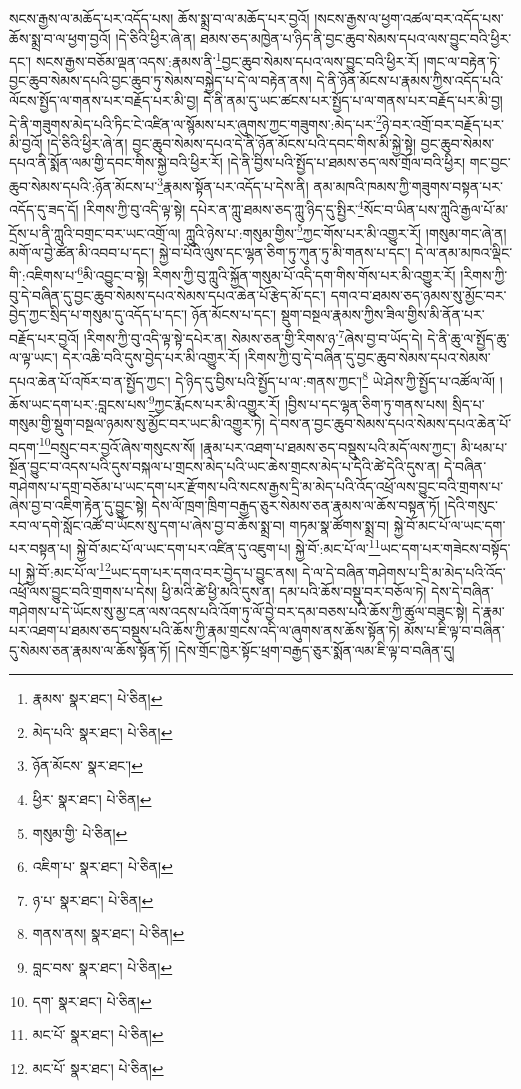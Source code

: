 སངས་རྒྱས་ལ་མཆོད་པར་འདོད་པས། ཆོས་སྨྲ་བ་ལ་མཆོད་པར་བྱའོ། །སངས་རྒྱས་ལ་ཕྱག་འཚལ་བར་འདོད་པས་ཆོས་སྨྲ་བ་ལ་ཕྱག་བྱའོ། །དེ་ཅིའི་ཕྱིར་ཞེ་ན། ཐམས་ཅད་མཁྱེན་པ་ཉིད་ནི་བྱང་ཆུབ་སེམས་དཔའ་ལས་བྱུང་བའི་ཕྱིར་དང་། སངས་རྒྱས་བཅོམ་ལྡན་འདས་:རྣམས་ནི་\footnote{རྣམས་  སྣར་ཐང་།  པེ་ཅིན། }བྱང་ཆུབ་སེམས་དཔའ་ལས་བྱུང་བའི་ཕྱིར་རོ། །གང་ལ་བརྟེན་ཏེ་བྱང་ཆུབ་སེམས་དཔའི་བྱང་ཆུབ་ཏུ་སེམས་བསྐྱེད་པ་དེ་ལ་བརྟེན་ནས། དེ་ནི་ཉོན་མོངས་པ་རྣམས་ཀྱིས་འདོད་པའི་ལོངས་སྤྱོད་ལ་གནས་པར་བརྗོད་པར་མི་བྱ། དེ་ནི་ནམ་དུ་ཡང་ཚངས་པར་སྤྱོད་པ་ལ་གནས་པར་བརྗོད་པར་མི་བྱ། དེ་ནི་གཟུགས་མེད་པའི་ཏིང་ངེ་འཛིན་ལ་སྙོམས་པར་ཞུགས་ཀྱང་གཟུགས་:མེད་པར་\footnote{མེད་པའི་  སྣར་ཐང་།  པེ་ཅིན། }ཉེ་བར་འགྲོ་བར་བརྗོད་པར་མི་བྱའོ། །དེ་ཅིའི་ཕྱིར་ཞེ་ན། བྱང་ཆུབ་སེམས་དཔའ་དེ་ནི་ཉོན་མོངས་པའི་དབང་གིས་མི་སྐྱེ་སྟེ། བྱང་ཆུབ་སེམས་དཔའ་ནི་སྨོན་ལམ་གྱི་དབང་གིས་སྐྱེ་བའི་ཕྱིར་རོ། །དེ་ནི་བྱིས་པའི་སྤྱོད་པ་ཐམས་ཅད་ལས་གྲོལ་བའི་ཕྱིར། གང་བྱང་ཆུབ་སེམས་དཔའི་:ཉོན་མོངས་པ་\footnote{ཉོན་མོངས་  སྣར་ཐང་། }རྣམས་སྟོན་པར་འདོད་པ་དེས་ནི། ནམ་མཁའི་ཁམས་ཀྱི་གཟུགས་བསྟན་པར་འདོད་དུ་ཟད་དོ། །རིགས་ཀྱི་བུ་འདི་ལྟ་སྟེ། དཔེར་ན་ཀླུ་ཐམས་ཅད་ཀླུ་ཉིད་དུ་སྤྱིར་\footnote{ཕྱིར་  སྣར་ཐང་།  པེ་ཅིན། }སོང་བ་ཡིན་པས་ཀླུའི་རྒྱལ་པོ་མ་དྲོས་པ་ནི་ཀླུའི་བགྲང་བར་ཡང་འགྲོ་ལ། ཀླུའི་ཉེས་པ་:གསུམ་གྱིས་\footnote{གསུམ་གྱི་  པེ་ཅིན། }ཀྱང་གོས་པར་མི་འགྱུར་རོ། །གསུམ་གང་ཞེ་ན། མགོ་ལ་བྱེ་ཚན་མི་འབབ་པ་དང་། སྐྱེ་བ་པོའི་ལུས་དང་ལྷན་ཅིག་ཏུ་ཀུན་ཏུ་མི་གནས་པ་དང་། དེ་ལ་ནམ་མཁའ་ལྡིང་གི་:འཇིགས་པ་\footnote{འཇིག་པ་  སྣར་ཐང་།  པེ་ཅིན། }མི་འབྱུང་བ་སྟེ། རིགས་ཀྱི་བུ་ཀླུའི་སྐྱོན་གསུམ་པོ་འདི་དག་གིས་གོས་པར་མི་འགྱུར་རོ། །རིགས་ཀྱི་བུ་དེ་བཞིན་དུ་བྱང་ཆུབ་སེམས་དཔའ་སེམས་དཔའ་ཆེན་པོ་རྩེད་མོ་དང་། དགའ་བ་ཐམས་ཅད་ཉམས་སུ་མྱོང་བར་བྱེད་ཀྱང་སྲིད་པ་གསུམ་དུ་འདོད་པ་དང་། ཉོན་མོངས་པ་དང་། སྡུག་བསྔལ་རྣམས་ཀྱིས་ཟིལ་གྱིས་མི་ནོན་པར་བརྗོད་པར་བྱའོ། །རིགས་ཀྱི་བུ་འདི་ལྟ་སྟེ་དཔེར་ན། སེམས་ཅན་གྱི་རིགས་ཉ་\footnote{ཉ་པ་  སྣར་ཐང་།  པེ་ཅིན། }ཞེས་བྱ་བ་ཡོད་དེ། དེ་ནི་ཆུ་ལ་སྤྱོད་ཆུ་ལ་ལྟ་ཡང་། དེར་འཆི་བའི་དུས་བྱེད་པར་མི་འགྱུར་རོ། །རིགས་ཀྱི་བུ་དེ་བཞིན་དུ་བྱང་ཆུབ་སེམས་དཔའ་སེམས་དཔའ་ཆེན་པོ་འཁོར་བ་ན་སྤྱོད་ཀྱང་། དེ་ཉིད་དུ་བྱིས་པའི་སྤྱོད་པ་ལ་:གནས་ཀྱང་།\footnote{གནས་ནས།  སྣར་ཐང་།  པེ་ཅིན། } ཡེ་ཤེས་ཀྱི་སྤྱོད་པ་འཚོལ་ལོ། །ཆོས་ཡང་དག་པར་:བླངས་པས་\footnote{བླང་བས་  སྣར་ཐང་།  པེ་ཅིན། }ཀྱང་རྨོངས་པར་མི་འགྱུར་རོ། །བྱིས་པ་དང་ལྷན་ཅིག་ཏུ་གནས་པས། སྲིད་པ་གསུམ་གྱི་སྡུག་བསྔལ་ཉམས་སུ་མྱོང་བར་ཡང་མི་འགྱུར་ཏེ། དེ་བས་ན་བྱང་ཆུབ་སེམས་དཔའ་སེམས་དཔའ་ཆེན་པོ་བདག་\footnote{དག་  སྣར་ཐང་།  པེ་ཅིན། }བསྲུང་བར་བྱའོ་ཞེས་གསུངས་སོ། །རྣམ་པར་འཐག་པ་ཐམས་ཅད་བསྡུས་པའི་མདོ་ལས་ཀྱང་། མི་ཕམ་པ་སྔོན་བྱུང་བ་འདས་པའི་དུས་བསྐལ་པ་གྲངས་མེད་པའི་ཡང་ཆེས་གྲངས་མེད་པ་དེའི་ཚེ་དེའི་དུས་ན། དེ་བཞིན་གཤེགས་པ་དགྲ་བཅོམ་པ་ཡང་དག་པར་རྫོགས་པའི་སངས་རྒྱས་དྲི་མ་མེད་པའི་འོད་འཕྲོ་ལས་བྱུང་བའི་གྲགས་པ་ཞེས་བྱ་བ་འཇིག་རྟེན་དུ་བྱུང་སྟེ། དེས་ལོ་ཁྲག་ཁྲིག་བརྒྱད་ཅུར་སེམས་ཅན་རྣམས་ལ་ཆོས་བསྟན་ཏོ། །དེའི་གསུང་རབ་ལ་དགེ་སློང་འཚོ་བ་ཡོངས་སུ་དག་པ་ཞེས་བྱ་བ་ཆོས་སྨྲ་བ། གཏམ་སྣ་ཚོགས་སྨྲ་བ། སྐྱེ་བོ་མང་པོ་ལ་ཡང་དག་པར་བསྟན་པ། སྐྱེ་བོ་མང་པོ་ལ་ཡང་དག་པར་འཛིན་དུ་འཇུག་པ། སྐྱེ་བོ་:མང་པོ་ལ་\footnote{མང་པོ་  སྣར་ཐང་།  པེ་ཅིན། }ཡང་དག་པར་གཟེངས་བསྟོད་པ། སྐྱེ་བོ་:མང་པོ་ལ་\footnote{མང་པོ་  སྣར་ཐང་།  པེ་ཅིན། }ཡང་དག་པར་དགའ་བར་བྱེད་པ་བྱུང་ནས། དེ་ལ་དེ་བཞིན་གཤེགས་པ་དྲི་མ་མེད་པའི་འོད་འཕྲོ་ལས་བྱུང་བའི་གྲགས་པ་དེས། ཕྱི་མའི་ཚེ་ཕྱི་མའི་དུས་ན། དམ་པའི་ཆོས་བསྡུ་བར་བཅོལ་ཏེ། དེས་དེ་བཞིན་གཤེགས་པ་དེ་ཡོངས་སུ་མྱ་ངན་ལས་འདས་པའི་འོག་ཏུ་ལོ་བྱེ་བར་དམ་བཅས་པའི་ཆོས་ཀྱི་ཚུལ་བཟུང་སྟེ། དེ་རྣམ་པར་འཐག་པ་ཐམས་ཅད་བསྡུས་པའི་ཆོས་ཀྱི་རྣམ་གྲངས་འདི་ལ་ཞུགས་ནས་ཆོས་སྟོན་ཏེ། མོས་པ་ཇི་ལྟ་བ་བཞིན་དུ་སེམས་ཅན་རྣམས་ལ་ཆོས་སྟོན་ཏོ། །དེས་གྲོང་ཁྱེར་སྟོང་ཕྲག་བརྒྱད་ཅུར་སྨོན་ལམ་ཇི་ལྟ་བ་བཞིན་དུ། 